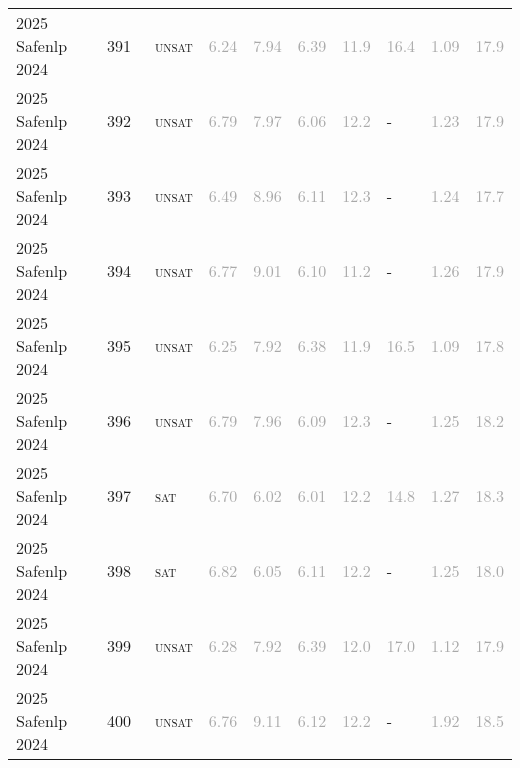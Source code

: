 \begin{center}
{\begin{longtable}{@{}llllllllll@{}}
2025 Safenlp 2024 & 391 & ~\textsc{unsat} & \textcolor{darkgray}{6.24} & \textcolor{darkgray}{7.94} & \textcolor{darkgray}{6.39} & \textcolor{darkgray}{11.9} & \textcolor{darkgray}{16.4} & \textcolor{darkgray}{1.09} & \textcolor{darkgray}{17.9} \\
2025 Safenlp 2024 & 392 & ~\textsc{unsat} & \textcolor{darkgray}{6.79} & \textcolor{darkgray}{7.97} & \textcolor{darkgray}{6.06} & \textcolor{darkgray}{12.2} & - & \textcolor{darkgray}{1.23} & \textcolor{darkgray}{17.9} \\
2025 Safenlp 2024 & 393 & ~\textsc{unsat} & \textcolor{darkgray}{6.49} & \textcolor{darkgray}{8.96} & \textcolor{darkgray}{6.11} & \textcolor{darkgray}{12.3} & - & \textcolor{darkgray}{1.24} & \textcolor{darkgray}{17.7} \\
2025 Safenlp 2024 & 394 & ~\textsc{unsat} & \textcolor{darkgray}{6.77} & \textcolor{darkgray}{9.01} & \textcolor{darkgray}{6.10} & \textcolor{darkgray}{11.2} & - & \textcolor{darkgray}{1.26} & \textcolor{darkgray}{17.9} \\
2025 Safenlp 2024 & 395 & ~\textsc{unsat} & \textcolor{darkgray}{6.25} & \textcolor{darkgray}{7.92} & \textcolor{darkgray}{6.38} & \textcolor{darkgray}{11.9} & \textcolor{darkgray}{16.5} & \textcolor{darkgray}{1.09} & \textcolor{darkgray}{17.8} \\
2025 Safenlp 2024 & 396 & ~\textsc{unsat} & \textcolor{darkgray}{6.79} & \textcolor{darkgray}{7.96} & \textcolor{darkgray}{6.09} & \textcolor{darkgray}{12.3} & - & \textcolor{darkgray}{1.25} & \textcolor{darkgray}{18.2} \\
2025 Safenlp 2024 & 397 & ~\textsc{sat} & \textcolor{darkgray}{6.70} & \textcolor{darkgray}{6.02} & \textcolor{darkgray}{6.01} & \textcolor{darkgray}{12.2} & \textcolor{darkgray}{14.8} & \textcolor{darkgray}{1.27} & \textcolor{darkgray}{18.3} \\
2025 Safenlp 2024 & 398 & ~\textsc{sat} & \textcolor{darkgray}{6.82} & \textcolor{darkgray}{6.05} & \textcolor{darkgray}{6.11} & \textcolor{darkgray}{12.2} & - & \textcolor{darkgray}{1.25} & \textcolor{darkgray}{18.0} \\
2025 Safenlp 2024 & 399 & ~\textsc{unsat} & \textcolor{darkgray}{6.28} & \textcolor{darkgray}{7.92} & \textcolor{darkgray}{6.39} & \textcolor{darkgray}{12.0} & \textcolor{darkgray}{17.0} & \textcolor{darkgray}{1.12} & \textcolor{darkgray}{17.9} \\
2025 Safenlp 2024 & 400 & ~\textsc{unsat} & \textcolor{darkgray}{6.76} & \textcolor{darkgray}{9.11} & \textcolor{darkgray}{6.12} & \textcolor{darkgray}{12.2} & - & \textcolor{darkgray}{1.92} & \textcolor{darkgray}{18.5} \\

\end{longtable}}
\end{center}
